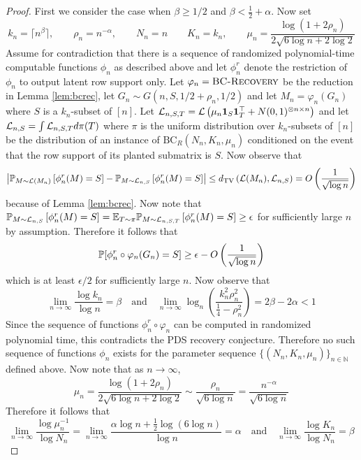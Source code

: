 \begin{proof}
First we consider the case when $\beta \ge 1/2$ and $\beta < \frac{1}{2} + \alpha$. Now set
$$k_n = \lceil n^{\beta} \rceil, \quad \quad \rho_n = n^{-\alpha}, \quad \quad N_n = n \quad \quad K_n = k_n, \quad \quad \mu_n = \frac{\log (1 + 2\rho_n)}{2 \sqrt{6 \log n + 2\log 2}}$$
Assume for contradiction that there is a sequence of randomized polynomial-time computable functions $\phi_n$ as described above and let $\phi_n^r$ denote the restriction of $\phi_n$ to output latent row support only. Let $\varphi_n = \textsc{BC-Recovery}$ be the reduction in Lemma \ref{lem:bcrec}, let $G_n \sim G(n, S, 1/2 + \rho_n, 1/2)$ and let $M_n = \varphi_n(G_n)$ where $S$ is a $k_n$-subset of $[n]$. Let $\mathcal{L}_{n, S, T} = \mathcal{L}\left( \mu_n \mathbf{1}_S \mathbf{1}_T^\top + N(0, 1)^{\otimes n \times n} \right)$ and let $\mathcal{L}_{n, S} = \int \mathcal{L}_{n, S, T} d\pi(T)$ where $\pi$ is the uniform distribution over $k_n$-subsets of $[n]$ be the distribution of an instance of $\text{BC}_R(N_n, K_n, \mu_n)$ conditioned on the event that the row support of its planted submatrix is $S$. Now observe that
$$\left| \mathbb{P}_{M \sim \mathcal{L}(M_n)} \left[ \phi_n^r(M) = S \right] - \mathbb{P}_{M \sim \mathcal{L}_{n, S}}\left[ \phi_n^r(M) = S\right]\right| \le d_{\text{TV}}\left( \mathcal{L}(M_n), \mathcal{L}_{n, S} \right) = O\left( \frac{1}{\sqrt{\log n}} \right)$$
because of Lemma \ref{lem:bcrec}. Now note that $\mathbb{P}_{M \sim \mathcal{L}_{n, S}}\left[\phi_n^r(M) = S \right] = \mathbb{E}_{T \sim \pi} \mathbb{P}_{M \sim \mathcal{L}_{n, S, T}}\left[\phi_n^r(M) = S \right] \ge \epsilon$ for sufficiently large $n$ by assumption. Therefore it follows that
$$\mathbb{P}[\phi_n^r \circ \varphi_n(G_n) = S] \ge \epsilon - O\left( \frac{1}{\sqrt{\log n}} \right)$$
which is at least $\epsilon/2$ for sufficiently large $n$. Now observe that
$$\lim_{n \to \infty} \frac{\log k_n}{\log n} = \beta \quad \text{and} \quad \lim_{n \to \infty} \log_n \left( \frac{k_n^2 \rho_n^2}{\frac{1}{4} - \rho_n^2} \right) = 2\beta - 2\alpha < 1$$
Since the sequence of functions $\phi_n^r \circ \varphi_n$ can be computed in randomized polynomial time, this contradicts the PDS recovery conjecture. Therefore no such sequence of functions $\phi_n$ exists for the parameter sequence $\{ (N_n, K_n, \mu_n) \}_{n \in \mathbb{N}}$ defined above. Now note that as $n \to \infty$,
$$\mu_n = \frac{\log (1 + 2\rho_n)}{2 \sqrt{6 \log n + 2\log 2}} \sim \frac{\rho_n}{\sqrt{6 \log n}} = \frac{n^{-\alpha}}{\sqrt{6 \log n}}$$
Therefore it follows that
$$\lim_{n \to \infty} \frac{\log \mu_n^{-1}}{\log N_n} = \lim_{n \to \infty} \frac{\alpha \log n + \frac{1}{2} \log (6\log n)}{\log n} = \alpha \quad \text{and} \quad \lim_{n \to \infty} \frac{\log K_n}{\log N_n} = \beta$$

\end{proof}
